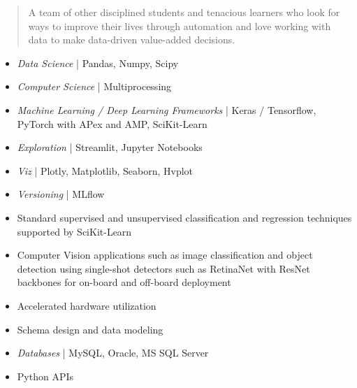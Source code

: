 \begin{quote}
\justify
A team of other disciplined students and tenacious learners who look for ways to improve their lives through automation and love working with data to make data-driven value-added decisions.
\end{quote}


\begin{itemize}
\item \textit{Data Science} | Pandas, Numpy, Scipy
\item \textit{Computer Science} | Multiprocessing
\item \textit{Machine Learning / Deep Learning Frameworks} | Keras / Tensorflow, PyTorch with APex and AMP, SciKit-Learn
\item \textit{Exploration} | Streamlit, Jupyter Notebooks
\item \textit{Viz} | Plotly, Matplotlib, Seaborn, Hvplot
\item \textit{Versioning} | MLflow

\end{itemize}

\begin{itemize}
\item Standard supervised and unsupervised classification and regression techniques supported by SciKit-Learn
\item Computer Vision applications such as image classification and object detection using single-shot detectors such as RetinaNet with ResNet backbones for on-board and off-board deployment
\item Accelerated hardware utilization

\end{itemize}

\begin{itemize}
\item Schema design and data modeling
\item \textit{Databases} | MySQL, Oracle, MS SQL Server
\item Python APIs

\end{itemize}

